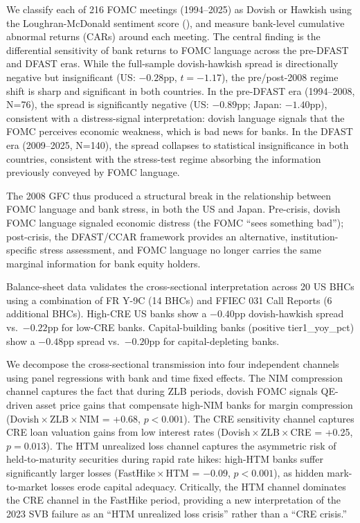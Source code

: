 \documentclass[12pt,a4paper]{article}
\begin{document}
We classify each of 216 FOMC meetings (1994--2025) as Dovish or Hawkish using the Loughran-McDonald sentiment score (\citet{Loughran2011}), and measure bank-level cumulative abnormal returns (CARs) around each meeting. The central finding is the differential sensitivity of bank returns to FOMC language across the pre-DFAST and DFAST eras. While the full-sample dovish-hawkish spread is directionally negative but insignificant (US: $-0.28$pp, $t = -1.17$), the pre/post-2008 regime shift is sharp and significant in both countries. In the pre-DFAST era (1994--2008, N=76), the spread is significantly negative (US: $-0.89$pp; Japan: $-1.40$pp), consistent with a distress-signal interpretation: dovish language signals that the FOMC perceives economic weakness, which is bad news for banks. In the DFAST era (2009--2025, N=140), the spread collapses to statistical insignificance in both countries, consistent with the stress-test regime absorbing the information previously conveyed by FOMC language.

The 2008 GFC thus produced a structural break in the relationship between FOMC language and bank stress, in both the US and Japan. Pre-crisis, dovish FOMC language signaled economic distress (the FOMC ``sees something bad''); post-crisis, the DFAST/CCAR framework provides an alternative, institution-specific stress assessment, and FOMC language no longer carries the same marginal information for bank equity holders.

Balance-sheet data validates the cross-sectional interpretation across 20 US BHCs using a combination of FR Y-9C (14 BHCs) and FFIEC 031 Call Reports (6 additional BHCs). High-CRE US banks show a $-0.40$pp dovish-hawkish spread vs.\ $-0.22$pp for low-CRE banks. Capital-building banks (positive tier1\_yoy\_pct) show a $-0.48$pp spread vs.\ $-0.20$pp for capital-depleting banks.

We decompose the cross-sectional transmission into four independent channels using panel regressions with bank and time fixed effects. The NIM compression channel captures the fact that during ZLB periods, dovish FOMC signals QE-driven asset price gains that compensate high-NIM banks for margin compression (Dovish\,$\times$\,ZLB\,$\times$\,NIM = +0.68, $p < 0.001$). The CRE sensitivity channel captures CRE loan valuation gains from low interest rates (Dovish\,$\times$\,ZLB\,$\times$\,CRE = +0.25, $p = 0.013$). The HTM unrealized loss channel captures the asymmetric risk of held-to-maturity securities during rapid rate hikes: high-HTM banks suffer significantly larger losses (FastHike\,$\times$\,HTM = $-0.09$, $p < 0.001$), as hidden mark-to-market losses erode capital adequacy. Critically, the HTM channel dominates the CRE channel in the FastHike period, providing a new interpretation of the 2023 SVB failure as an ``HTM unrealized loss crisis'' rather than a ``CRE crisis.''
\end{document}
